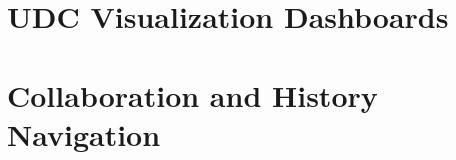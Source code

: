 \documentclass[12pt]{report}
\begin{document}
\begin{doublespace}
\chapter{UDC Visualization Dashboards}
\chapter{Collaboration and History Navigation}


%
%
%
%
%
%

\end{doublespace}
\end{document}
